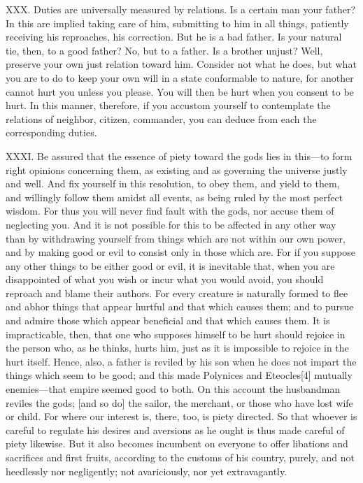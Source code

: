 \documentclass[a4paper]{article}
\begin{document}
XXX. Duties are universally measured by relations. Is a certain man your
father? In this are implied taking care of him, submitting to him in all
things, patiently receiving his reproaches, his correction. But he is a
bad father. Is your natural tie, then, to a good father? No, but to a
father. Is a brother unjust? Well, preserve your own just relation toward
him. Consider not what he does, but what you are to do to keep your
own will in a state conformable to nature, for another cannot hurt you
unless you please. You will then be hurt when you consent to be hurt. In
this manner, therefore, if you accustom yourself to contemplate the
relations of neighbor, citizen, commander, you can deduce from each the
corresponding duties.


XXXI. Be assured that the essence of piety toward the gods lies in this—to form
right opinions concerning them, as existing and as governing the universe
justly and well. And fix yourself in this resolution, to obey them, and
yield to them, and willingly follow them amidst all events, as being
ruled by the most perfect wisdom. For thus you will never find fault with
the gods, nor accuse them of neglecting you. And it is not possible for
this to be affected in any other way than by withdrawing yourself from
things which are not within our own power, and by making good or evil to
consist only in those which are. For if you suppose any other things to
be either good or evil, it is inevitable that, when you are disappointed
of what you wish or incur what you would avoid, you should reproach and
blame their authors. For every creature is naturally formed to flee and
abhor things that appear hurtful and that which causes them; and to
pursue and admire those which appear beneficial and that which causes
them. It is impracticable, then, that one who supposes himself to be hurt
should rejoice in the person who, as he thinks, hurts him, just as it is
impossible to rejoice in the hurt itself. Hence, also, a father is
reviled by his son when he does not impart the things which seem to be
good; and this made Polynices and Eteocles[4] mutually enemies—that
empire seemed good to both. On this account the husbandman reviles the
gods; [and so do] the sailor, the merchant, or those who have lost wife
or child. For where our interest is, there, too, is piety directed. So
that whoever is careful to regulate his desires and aversions as he ought
is thus made careful of piety likewise. But it also becomes incumbent on
everyone to offer libations and sacrifices and first fruits, according to
the customs of his country, purely, and not heedlessly nor negligently;
not avariciously, nor yet extravagantly.
\end{document}
